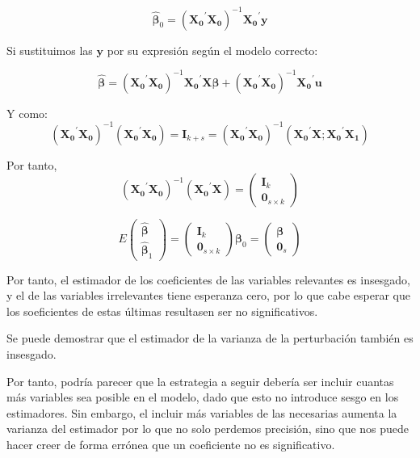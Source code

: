\[\hat{\boldsymbol{\beta}}_0=\left(\boldsymbol{X_0}^{\prime}\boldsymbol{X_0}\right)^{-1}\boldsymbol{X_0}^{\prime}\boldsymbol{y}\] 

Si sustituimos las $\boldsymbol{y}$ por su expresi\'on seg\'un el modelo correcto:

\[\hat{\boldsymbol{\beta}}=\left(\boldsymbol{X_0}^{\prime}\boldsymbol{X_0}\right)^{-1}\boldsymbol{X_0}^{\prime}\boldsymbol{X}\boldsymbol{\beta}+\left(\boldsymbol{X_0}^{\prime}\boldsymbol{X_0}\right)^{-1}\boldsymbol{X_0}^{\prime}\boldsymbol{u}\]

Y como:
\[\left(\boldsymbol{X_0}^{\prime}\boldsymbol{X_0}\right)^{-1}\left(\boldsymbol{X_0}^{\prime}\boldsymbol{X_0}\right)=\boldsymbol{I}_{k+s}=\left(\boldsymbol{X_0}^{\prime}\boldsymbol{X_0}\right)^{-1}\left(\boldsymbol{X_0}^{\prime}\boldsymbol{X};\boldsymbol{X_0}^{\prime}\boldsymbol{X_1}\right)\]

Por tanto,
\[\left(\boldsymbol{X_0}^{\prime}\boldsymbol{X_0}\right)^{-1}\left(\boldsymbol{X_0}^{\prime}\boldsymbol{X}\right)=\left(\begin{matrix}
\boldsymbol{I}_k \\
\boldsymbol{0}_{s\times k}
\end{matrix}\right)\]

\[E\left(\begin{matrix}
\hat{\boldsymbol{\beta}} \\
\hat{\boldsymbol{\beta}}_1
\end{matrix}\right)=\left(\begin{matrix}
\boldsymbol{I}_k \\
\boldsymbol{0}_{s\times k}
\end{matrix}\right)\boldsymbol{\beta}_0=\left(\begin{matrix}
\boldsymbol{\beta} \\
\boldsymbol{0}_{s}
\end{matrix}\right)\]

Por tanto, el estimador de los coeficientes de las variables relevantes es insesgado, y el de las variables irrelevantes tiene esperanza cero, por lo que cabe esperar que los soeficientes de estas \'ultimas resultasen ser no significativos.

Se puede demostrar que el estimador de la varianza de la perturbaci\'on tambi\'en es insesgado.

Por tanto, podr\'ia parecer que la estrategia a seguir deber\'ia ser incluir cuantas m\'as variables sea posible en el modelo, dado que esto no introduce sesgo en los estimadores. Sin embargo, el incluir m\'as variables de las necesarias aumenta la varianza del estimador por lo que no solo perdemos precisi\'on, sino que nos puede hacer creer de forma err\'onea que un coeficiente no es significativo. 

